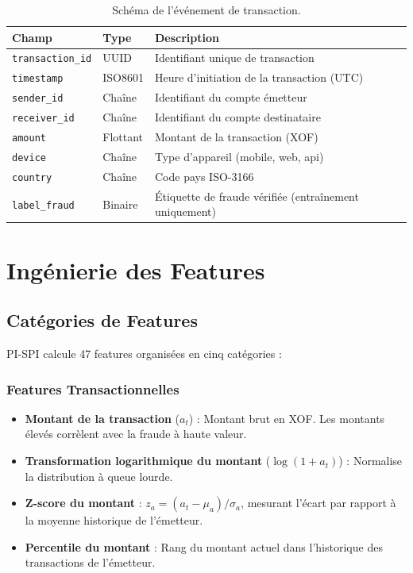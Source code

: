 \documentclass[12pt,a4paper,oneside]{book}
\theoremstyle{definition}
\theoremstyle{plain}
\begin{document}
\begin{table}[H]
  \centering
  \caption{Schéma de l'événement de transaction.}
  \label{tab:schema}
  \begin{tabularx}{\linewidth}{llX}
    \toprule
    \textbf{Champ} & \textbf{Type} & \textbf{Description} \\
    \midrule
    \texttt{transaction\_id} & UUID    & Identifiant unique de transaction \\
    \texttt{timestamp}       & ISO8601 & Heure d'initiation de la transaction (UTC) \\
    \texttt{sender\_id}      & Chaîne  & Identifiant du compte émetteur \\
    \texttt{receiver\_id}    & Chaîne  & Identifiant du compte destinataire \\
    \texttt{amount}          & Flottant & Montant de la transaction (XOF) \\
    \texttt{device}          & Chaîne  & Type d'appareil (mobile, web, api) \\
    \texttt{country}         & Chaîne  & Code pays ISO-3166 \\
    \texttt{label\_fraud}    & Binaire & Étiquette de fraude vérifiée (entraînement uniquement) \\
    \bottomrule
  \end{tabularx}
\end{table}

\section{Ingénierie des Features}

\subsection{Catégories de Features}

PI-SPI calcule 47 features organisées en cinq catégories :

\subsubsection{Features Transactionnelles}

\begin{itemize}
  \item \textbf{Montant de la transaction} ($a_t$) : Montant brut en XOF. Les montants élevés corrèlent avec la fraude à haute valeur.
  \item \textbf{Transformation logarithmique du montant} ($\log(1+a_t)$) : Normalise la distribution à queue lourde.
  \item \textbf{Z-score du montant} : $z_a = (a_t - \mu_a) / \sigma_a$, mesurant l'écart par rapport à la moyenne historique de l'émetteur.
  \item \textbf{Percentile du montant} : Rang du montant actuel dans l'historique des transactions de l'émetteur.
\end{itemize}
\end{document}
